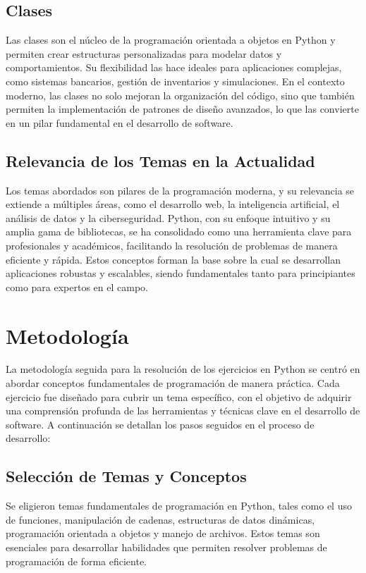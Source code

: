 \documentclass[conference]{IEEEtran}
\begin{document}
\subsection{Clases}
Las clases son el núcleo de la programación orientada a objetos en Python y permiten crear estructuras personalizadas para modelar datos y comportamientos. Su flexibilidad las hace ideales para aplicaciones complejas, como sistemas bancarios, gestión de inventarios y simulaciones. En el contexto moderno, las clases no solo mejoran la organización del código, sino que también permiten la implementación de patrones de diseño avanzados, lo que las convierte en un pilar fundamental en el desarrollo de software.


\subsection{Relevancia de los Temas en la Actualidad}
Los temas abordados son pilares de la programación moderna, y su relevancia se extiende a múltiples áreas, como el desarrollo web, la inteligencia artificial, el análisis de datos y la ciberseguridad. Python, con su enfoque intuitivo y su amplia gama de bibliotecas, se ha consolidado como una herramienta clave para profesionales y académicos, facilitando la resolución de problemas de manera eficiente y rápida. Estos conceptos forman la base sobre la cual se desarrollan aplicaciones robustas y escalables, siendo fundamentales tanto para principiantes como para expertos en el campo.


	
\section{Metodología}

La metodología seguida para la resolución de los ejercicios en Python se centró en abordar conceptos fundamentales de programación de manera práctica. Cada ejercicio fue diseñado para cubrir un tema específico, con el objetivo de adquirir una comprensión profunda de las herramientas y técnicas clave en el desarrollo de software. A continuación se detallan los pasos seguidos en el proceso de desarrollo:

\subsection{Selección de Temas y Conceptos}
Se eligieron temas fundamentales de programación en Python, tales como el uso de funciones, manipulación de cadenas, estructuras de datos dinámicas, programación orientada a objetos y manejo de archivos. Estos temas son esenciales para desarrollar habilidades que permiten resolver problemas de programación de forma eficiente.
\end{document}
